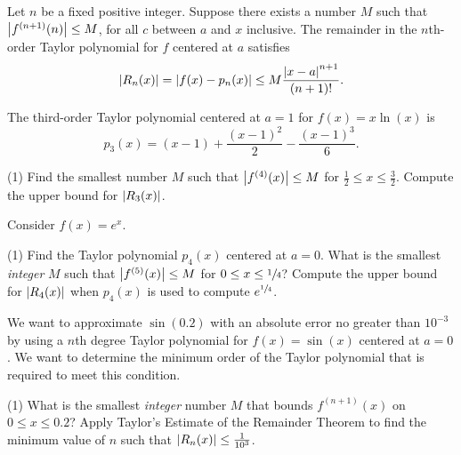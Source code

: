 \documentclass[../mathNotesPreamble]{subfiles}
\begin{document}
  \begin{thmBox*}
    Let $n$ be a fixed positive integer. Suppose there exists a number $M$ such that ${\left\vert f^{(n+1)}(n)\right\vert}\leq M$, for all $c$ between $a$ and $x$ inclusive. The remainder in the $n$th-order Taylor polynomial for $f$ centered at $a$ satisfies
      \[{\left\vert R_n(x)\right\vert}={\left\vert f(x)-p_n(x)\right\vert}\leq M\frac{{\left\vert x-a\right\vert}^{n+1}}{(n+1)!}.\]
  
  \end{thmBox*}
  \pagebreak

  \begin{ex*}[\textcolor{blue}{LC 27.1-27.2}]
    The third-order Taylor polynomial centered at $a=1$ for $f(x)=x\ln(x)$ is
      \[p_3(x)=(x-1)+\frac{(x-1)^2}{2}-\frac{(x-1)^3}{6}.\]
  \end{ex*}
  \begin{tasks}[after-item-skip=\stretch{1}, label=,item-indent=0pt](1)
    \task Find the smallest number $M$ such that ${\left\vert f^{(4)}(x)\right\vert}\leq M$ for $\frac{1}{2}\leq x\leq \frac{3}{2}.$
    \task Compute the upper bound for ${\left\vert R_3(x)\right\vert}$.
  \end{tasks}
  \pagebreak

  \begin{ex*}[\textcolor{blue}{LC 27.3-27.5}]
    Consider $f(x)=e^x$.
  \end{ex*}
  \begin{tasks}[after-item-skip=\stretch{1}, label=,item-indent=0pt](1)
    \task Find the Taylor polynomial $p_4(x)$ centered at $a=0$.
    \task What is the smallest \textit{integer} $M$ such that ${\left\vert f^{(5)}(x)\right\vert}\leq M$ for $0\leq x\leq \sfrac{1}{4}$?
    \task Compute the upper bound for ${\left\vert R_4(x)\right\vert}$ when $p_4(x)$ is used to compute $e^{\sfrac{1}{4}}$.
  \end{tasks}
  \pagebreak

  \begin{ex*}[\textcolor{blue}{LC 27.6-27.7}]
    We want to approximate $\sin(0.2)$ with an absolute error no greater than $10^{-3}$ by using a $n$th degree Taylor polynomial for $f(x)=\sin(x)$ centered at $a=0$. We want to determine the minimum order of the Taylor polynomial that is required to meet this condition.
  \end{ex*}
  \begin{tasks}[after-item-skip=\stretch{1}, label=,item-indent=0pt](1)
    \task 
      What is the smallest \textit{integer} number $M$ that bounds $f^{(n+1)}(x)$ on $0\leq x\leq 0.2$?
    \task 
      Apply Taylor's Estimate of the Remainder Theorem to find the minimum value of $n$ such that ${\left\vert R_n(x)\right\vert}\leq \frac{1}{10^3}$.
  \end{tasks}
  \pagebreak
\end{document}
